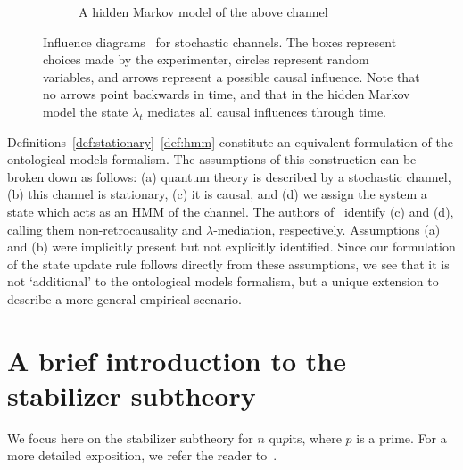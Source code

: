 \documentclass[%
 reprint,
superscriptaddress,
nofootinbib,
 amsmath,amssymb,
 prx, 
 accepted=2019-09-27,
]{quantumarticle}
\begin{document}
\begin{figure}
\begin{subfigure}[t]{0.48\textwidth}
    \caption{A hidden Markov model of the above channel}
    \label{fig:hmm} 
  \end{subfigure}

  \caption{Influence diagrams~\cite{HowardInfluenceDiagrams2005} for
    stochastic channels. The boxes represent choices made by the
    experimenter, circles represent random variables, and arrows
    represent a possible causal influence. Note that no arrows point
    backwards in time, and that in the hidden Markov model the state
    $\lambda_t$ mediates all causal influences through time.}
  \label{fig:influence-diagram}
\end{figure}


Definitions~\ref{def:stationary}--\ref{def:hmm} constitute an
equivalent formulation of the ontological models formalism. The
assumptions of this construction can be broken down as follows: (a)
quantum theory is described by a stochastic channel, (b) this channel
is stationary, (c) it is causal, and (d) we assign the system a state
which acts as an HMM of the channel. The authors
of~\cite{Leifertimesymmetricinterpretation2017} identify (c) and (d),
calling them non-retrocausality and $\lambda$-mediation,
respectively. Assumptions (a) and (b) were implicitly present but not
explicitly identified. Since our formulation of the state update rule
follows directly from these assumptions, we see that it is not
`additional' to the ontological models formalism, but a unique
extension to describe a more general empirical scenario.
 

\section{A brief introduction to the stabilizer subtheory}
\label{sec:wigner-intro}
We focus here on the stabilizer subtheory for $n$ qu$p$its, where $p$
is a prime. For a more detailed exposition, we refer the reader
to~\cite{GrossHudsonTheoremfinitedimensional2006,VeitchResourceTheoryStabilizer2014}.
\end{document}
